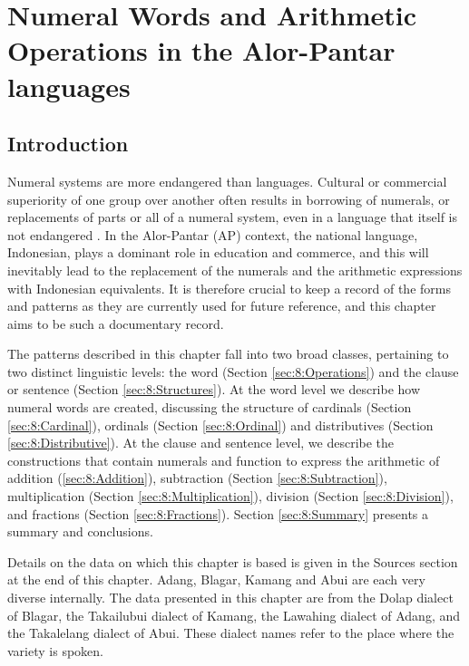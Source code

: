 \chapter{Numeral Words and Arithmetic Operations in the Alor-Pantar languages} 
 
 

\section{Introduction}
\label{sec:8:Introduction}
\hypertarget{Toc376958929}{}Numeral systems are more endangered than languages. Cultural or commercial superiority of one group over another often results in borrowing of numerals, or replacements of parts or all of a numeral system, even in a language that itself is not endangered \citep{Comrie2005numsys}. In the Alor-Pantar (AP) context, the national language, Indonesian, plays a dominant role in education and commerce, and this will inevitably lead to the replacement of the numerals and the arithmetic expressions with Indonesian equivalents. It is therefore crucial to keep a record of the forms and patterns as they are currently used for future reference, and this chapter aims to be such a documentary record. 


The patterns described in this chapter fall into two broad classes, pertaining to two distinct linguistic levels: the word (Section \ref{sec:8:Operations}) and the clause or sentence (Section \ref{sec:8:Structures}). At the word level we describe how numeral words are created, discussing the structure of cardinals (Section \ref{sec:8:Cardinal}), ordinals (Section \ref{sec:8:Ordinal}) and distributives (Section \ref{sec:8:Distributive}). At the clause and sentence level, we describe the constructions that contain numerals and function to express the arithmetic of addition (\ref{sec:8:Addition}), subtraction (Section \ref{sec:8:Subtraction}), multiplication (Section \ref{sec:8:Multiplication}), division (Section \ref{sec:8:Division}), and fractions (Section \ref{sec:8:Fractions}). Section \ref{sec:8:Summary} presents a summary and conclusions. 

Details on the data on which this chapter is based is given in the  Sources section at the end of this chapter. Adang, Blagar, Kamang and Abui are each very diverse internally. The data presented in this chapter are from the Dolap dialect of Blagar, the Takailubui dialect of Kamang, the Lawahing dialect of Adang, and the Takalelang dialect of Abui. These dialect names refer to the place where the variety is spoken.


